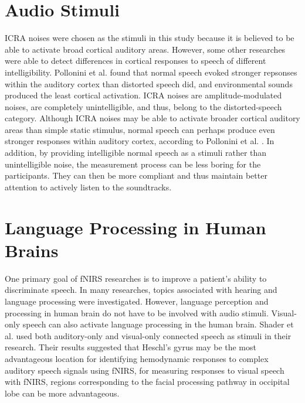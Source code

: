 \section{Audio Stimuli}
ICRA noises were chosen as the stimuli in this study because it is believed to be able to activate broad cortical auditory areas. However, some other researches were able to detect differences in cortical responses to speech of different intelligibility. Pollonini et al. \citeyear{Pollonini2013} found that normal speech evoked stronger repsonses within the auditory cortex than distorted speech did, and environmental sounds produced the least cortical activation. ICRA noises are amplitude-modulated noises, are completely unintelligible, and thus, belong to the distorted-speech category. Although ICRA noises may be able to activate broader cortical auditory areas than simple static stimulus, normal speech can perhaps produce even stronger responses within auditory cortex, according to Pollonini et al. \citeyear{Pollonini2013}. In addition, by providing intelligible normal speech as a stimuli rather than unintelligible noise, the measurement process can be less boring for the participants. They can then be more compliant and thus maintain better attention to actively listen to the soundtracks.

\section{Language Processing in Human Brains}
One primary goal of fNIRS researches is to improve a patient's ability to discriminate speech. In many researches, topics associated with hearing and language processing were investigated. However, language perception and processing in human brain do not have to be involved with audio stimuli. Visual-only speech can also activate language processing in the human brain. Shader et al. \citeyear{Shader2021} used both auditory-only and visual-only connected speech as stimuli in their research. Their results suggested that Heschl's gyrus may be the most advantageous location for identifying hemodynamic responses to complex auditory speech signals using fNIRS, for measuring responses to visual speech with fNIRS, regions corresponding to the facial processing pathway in occipital lobe can be more advantageous.

